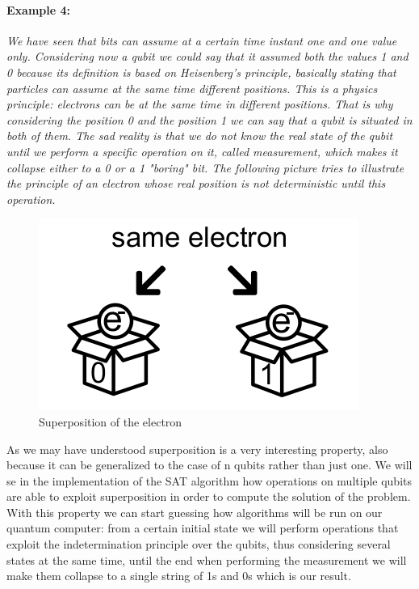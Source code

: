 \documentclass[english]{article}
\begin{document}
				\paragraph{Example 4:} \emph{We have seen that bits can assume at a certain time instant one and one value only. Considering now a qubit we could say that it assumed both the values 1 and 0 because its definition is based on Heisenberg's principle, basically stating that particles can assume at the same time different positions. This is a physics principle: electrons can be at the same time in different positions. That is why considering the position 0 and the position 1 we can say that a qubit is situated in both of them. The sad reality is that we do not know the real state of the qubit until we perform a specific operation on it, called measurement, which makes it collapse either to a 0 or a 1 "boring" bit. The following picture tries to illustrate the principle of an electron whose real position is not deterministic until this operation.}
				
				\begin{figure}[h]
					\centering
					\includegraphics[scale=0.75]{superposition.png}
					\caption{Superposition of the electron}
				\end{figure}
			
				As we may have understood superposition is a very interesting property, also because it can be generalized to the case of n qubits rather than just one. We will se in the implementation of the SAT algorithm how operations on multiple qubits are able to exploit superposition in order to compute the solution of the problem. With this property we can start guessing how algorithms will be run on our quantum computer: from a certain initial state we will perform operations that exploit the indetermination principle over the qubits, thus considering several states at the same time, until the end when performing the measurement we will make them collapse to a single string of 1s and 0s which is our result.
			
\end{document}
